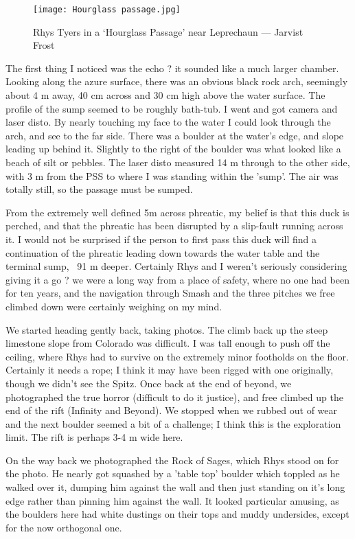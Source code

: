 \documentclass[onecolumn]{book}
\begin{document}
\begin{figure}[h!]
\centering
\texttt{[image: Hourglass passage.jpg]}
\caption{Rhys Tyers in a \lq Hourglass Passage' near Leprechaun --- Jarvist Frost}
\label{Hourglass Passage}
\end{figure}

The first thing I noticed was the echo ? it sounded like a much larger chamber. Looking along the azure surface, there was an obvious black rock arch, seemingly about 4 m away, 40 cm across and 30 cm high above the water surface. The profile of the sump seemed to be roughly bath-tub.
I went and got camera and laser disto. By nearly touching my face to the water I could look through the arch, and see to the far side. There was a boulder at the water's edge, and slope leading up behind it. Slightly to the right of the boulder was what looked like a beach of silt or pebbles. The laser disto measured 14 m through to the other side, with 3 m from the PSS to where I was standing within the 'sump'. The air was totally still, so the passage must be sumped.

From the extremely well defined 5m across phreatic, my belief is that this duck is perched, and that the phreatic has been disrupted by a slip-fault running across it. I would not be surprised if the person to first pass this duck will find a continuation of the phreatic leading down towards the water table and the terminal sump, ~91 m deeper.
Certainly Rhys and I weren't seriously considering giving it a go ? we were a long way from a place of safety, where no one had been for ten years, and the navigation through Smash and the three pitches we free climbed down were certainly weighing on my mind.

We started heading gently back, taking photos. The climb back up the steep limestone slope from Colorado was difficult. I was tall enough to push off the ceiling, where Rhys had to survive on the extremely minor footholds on the floor. Certainly it needs a rope; I think it may have been rigged with one originally, though we didn't see the Spitz.
Once back at the end of beyond, we photographed the true horror (difficult to do it justice), and free climbed up the end of the rift (Infinity and Beyond). We stopped when we rubbed out of wear and the next boulder seemed a bit of a challenge; I think this is the exploration limit. The rift is perhaps 3-4 m wide here.

On the way back we photographed the Rock of Sages, which Rhys stood on for the photo. He nearly got squashed by a 'table top' boulder which toppled as he walked over it, dumping him against the wall and then just standing on it's long edge rather than pinning him against the wall. It looked particular amusing, as the boulders here had white dustings on their tops and muddy undersides, except for the now orthogonal one.
\end{document}
